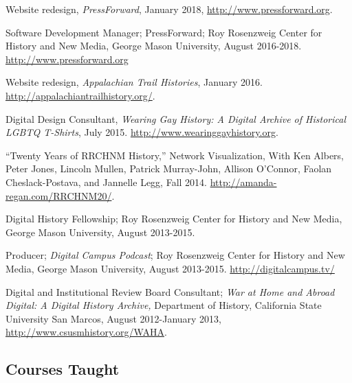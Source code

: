 \documentclass[11pt]{article}
\begin{document}
Website redesign, \emph{PressForward}, January 2018, \url{http://www.pressforward.org}.

Software Development Manager; PressForward; Roy Rosenzweig Center for History and New Media, George Mason University, August 2016-2018. \url{http://www.pressforward.org}

Website redesign, \emph{Appalachian Trail Histories}, January 2016. \url{http://appalachiantrailhistory.org/}.

Digital Design Consultant, \emph{Wearing Gay History: A Digital Archive of Historical LGBTQ T-Shirts}, July 2015. \url{http://www.wearinggayhistory.org}.

``Twenty Years of RRCHNM History,'' Network Visualization, With Ken Albers, Peter Jones, Lincoln Mullen, Patrick Murray-John, Allison O’Connor, Faolan Cheslack-Postava, and Jannelle Legg, Fall 2014. \url{http://amanda-regan.com/RRCHNM20/}.

Digital History Fellowship; Roy Rosenzweig Center for History and New Media, George Mason University, August 2013-2015.

Producer; \emph{Digital Campus Podcast}; Roy Rosenzweig Center for History and New Media, George Mason University, August 2013-2015. \url{http://digitalcampus.tv/}

Digital and Institutional Review Board Consultant; \emph{War at Home and Abroad Digital: A Digital History Archive,} Department of History, California State University San Marcos, August 2012-January 2013, \url{http://www.csusmhistory.org/WAHA}.


\subsection{Courses Taught}
\end{document}
